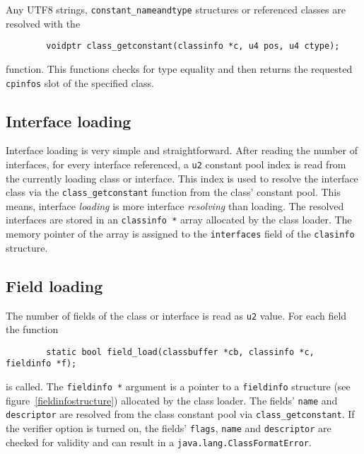 Any UTF8 strings, \texttt{constant\_nameandtype} structures or
referenced classes are resolved with the

\begin{verbatim}
        voidptr class_getconstant(classinfo *c, u4 pos, u4 ctype);
\end{verbatim}

function. This functions checks for type equality and then returns the
requested \texttt{cpinfos} slot of the specified class.


\subsection{Interface loading}

Interface loading is very simple and straightforward. After reading
the number of interfaces, for every interface referenced, a
\texttt{u2} constant pool index is read from the currently loading
class or interface. This index is used to resolve the interface class
via the \texttt{class\_getconstant} function from the class' constant
pool. This means, interface \textit{loading} is more interface
\textit{resolving} than loading. The resolved interfaces are stored
in an \texttt{classinfo *} array allocated by the class loader. The
memory pointer of the array is assigned to the \texttt{interfaces}
field of the \texttt{clasinfo} structure.


\subsection{Field loading}

The number of fields of the class or interface is read as \texttt{u2}
value. For each field the function

\begin{verbatim}
        static bool field_load(classbuffer *cb, classinfo *c, fieldinfo *f);
\end{verbatim}

is called. The \texttt{fieldinfo *} argument is a pointer to a
\texttt{fieldinfo} structure (see figure~\ref{fieldinfostructure})
allocated by the class loader. The fields' \texttt{name} and
\texttt{descriptor} are resolved from the class constant pool via
\texttt{class\_getconstant}. If the verifier option is turned on, the
fields' \texttt{flags}, \texttt{name} and \texttt{descriptor} are
checked for validity and can result in a
\texttt{java.lang.ClassFormatError}.

